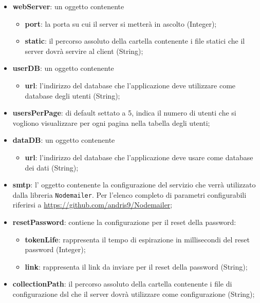 \begin{itemize}
\item \textbf{webServer}: un oggetto contenente
		\begin{itemize}
		\item \textbf{port}: la porta su cui il server si metterà in ascolto (Integer);
		\item \textbf{static}: il percorso assoluto della cartella contenente i file statici che il server dovrà servire al client (String);
		\end{itemize}
		
\item \textbf{userDB}: un oggetto contenente
		\begin{itemize}
		\item \textbf{url}: l'indirizzo del database che l'applicazione deve utilizzare come database degli utenti (String);
		\end{itemize}

\item \textbf{usersPerPage}: di default settato a 5, indica il numero di utenti che si vogliono visualizzare per ogni pagina nella tabella degli utenti;
		
\item \textbf{dataDB}: un oggetto contenente
		\begin{itemize}
		\item \textbf{url}: l'indirizzo del database che l'applicazione deve usare come database dei dati (String);
		\end{itemize}

\item \textbf{smtp}: l' oggetto contenente la configurazione del servizio  che verrà utilizzato dalla libreria \texttt{Nodemailer}. Per l'elenco completo di parametri configurabili riferirsi a \url{https://github.com/andris9/Nodemailer};
		
\item \textbf{resetPassword}: contiene la configurazione per il reset della password:
	\begin{itemize}
		\item \textbf{tokenLife}: rappresenta il tempo di espirazione in millisecondi del reset password (Integer);
		\item \textbf{link}: rappresenta il link da inviare per il reset della password (String);
	\end{itemize}

\item \textbf{collectionPath}: il percorso assoluto della cartella contenente i file di configurazione dsl che il server dovrà utilizzare come configurazione (String);
		

\end{itemize}
